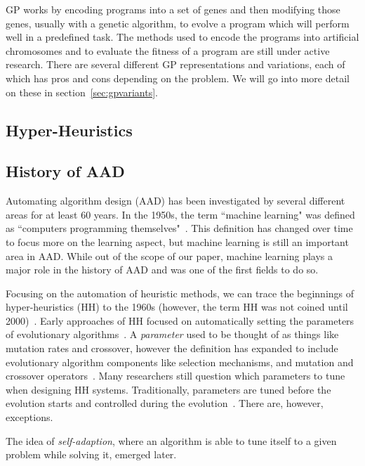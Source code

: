 \documentclass{sig-alternate}
\begin{document}
GP works by encoding programs into a set of genes and then modifying those genes, usually with a genetic algorithm, to evolve a program which will perform well in a predefined task. The methods used to encode the programs into artificial chromosomes and to evaluate the fitness of a program are still under active research. There are several different GP representations and variations, each of which has pros and cons depending on the problem. We will go into more detail on these in section~\ref{sec:gpvariants}.

\subsection{Hyper-Heuristics}
\label{sec:HH}

\subsection{History of AAD}
\label{sec:history}
Automating algorithm design (AAD) has been investigated by several different areas for at least 60 years. In the 1950s, the term ``machine learning" was defined as ``computers programming themselves"~\cite{pappa:2014}. This definition has changed over time to focus more on the learning aspect, but machine learning is still an important area in AAD. While out of the scope of our paper, machine learning plays a major role in the history of AAD and was one of the first fields to do so.

Focusing on the automation of heuristic methods, we can trace the beginnings of hyper-heuristics (HH) to the 1960s (however, the term HH was not coined until 2000)~\cite{pappa:2014}. Early approaches of HH focused on automatically setting the parameters of evolutionary algorithms~\cite{pappa:2014}. A \textit{parameter} used to be thought of as things like mutation rates and crossover, however the definition has expanded to include evolutionary algorithm components like selection mechanisms, and mutation and crossover operators~\cite{pappa:2014}. Many researchers still question which parameters to tune when designing HH systems. Traditionally, parameters are tuned before the evolution starts and controlled during the evolution~\cite{pappa:2014}. There are, however, exceptions.

The idea of \textit{self-adaption}, where an algorithm is able to tune itself to a given problem while solving it, emerged later.
\end{document}
